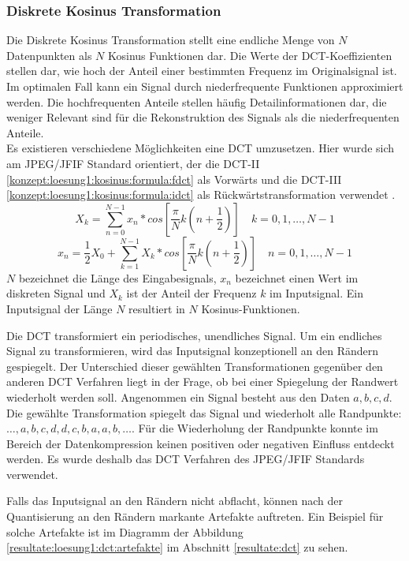 \subsubsection{Diskrete Kosinus Transformation} \label{konzept:loesung1:kosinus}
Die Diskrete Kosinus Transformation stellt eine endliche Menge von $N$ Datenpunkten als $N$ Kosinus Funktionen dar. Die Werte der DCT-Koeffizienten stellen dar, wie hoch der Anteil einer bestimmten Frequenz im Originalsignal ist. Im optimalen Fall kann ein Signal durch niederfrequente Funktionen approximiert werden. Die hochfrequenten Anteile stellen häufig Detailinformationen dar, die weniger Relevant sind für die Rekonstruktion des Signals als die niederfrequenten Anteile.\\
Es existieren verschiedene Möglichkeiten eine DCT umzusetzen. Hier wurde sich am JPEG/JFIF Standard orientiert, der die DCT-II \eqref{konzept:loesung1:kosinus:formula:fdct} als Vorwärts und die DCT-III \eqref{konzept:loesung1:kosinus:formula:idct} als Rückwärtstransformation verwendet \cite{wallace1992jpeg}. 
\begin{equation} \label{konzept:loesung1:kosinus:formula:fdct}
	X_k = \sum_{n=0}^{N-1}x_n*cos[\frac{\pi}{N}k(n+\frac{1}{2})] \quad k = 0, 1, \ldots, N-1
\end{equation}
\begin{equation} \label{konzept:loesung1:kosinus:formula:idct}
x_n  = \frac{1}{2}X_0 + \sum_{k=1}^{N-1}X_k*cos[\frac{\pi}{N}k(n+\frac{1}{2})] \quad n = 0,1,\ldots,N-1
\end{equation}
$N$ bezeichnet die Länge des Eingabesignals, $x_n$ bezeichnet einen Wert im diskreten Signal und $X_k$ ist der Anteil der Frequenz $k$ im Inputsignal. Ein Inputsignal der Länge $N$ resultiert in $N$ Kosinus-Funktionen.

Die DCT transformiert ein periodisches, unendliches Signal. Um ein endliches Signal zu transformieren, wird das Inputsignal konzeptionell an den Rändern gespiegelt. Der Unterschied dieser gewählten Transformationen gegenüber den anderen DCT Verfahren liegt in der Frage, ob bei einer Spiegelung der Randwert wiederholt werden soll. Angenommen ein Signal besteht aus den Daten $a,b,c,d$. Die gewählte Transformation spiegelt das Signal und wiederholt alle Randpunkte: $\ldots,a,b,c,d,d,c,b,a,a,b,\ldots$. Für die Wiederholung der Randpunkte konnte im Bereich der Datenkompression keinen positiven oder negativen Einfluss entdeckt werden. Es wurde deshalb das DCT Verfahren des JPEG/JFIF Standards verwendet.

Falls das Inputsignal an den Rändern nicht abflacht, können nach der Quantisierung an den Rändern markante Artefakte auftreten. Ein Beispiel für solche Artefakte ist im Diagramm der Abbildung \ref{resultate:loesung1:dct:artefakte} im Abschnitt \ref{resultate:dct} zu sehen.

